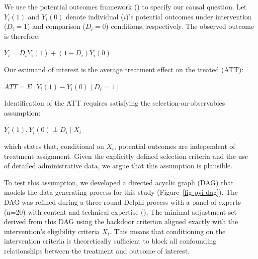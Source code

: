 \documentclass[
  jou,
  floatsintext,
  longtable,
  nolmodern,
  notxfonts,
  notimes,
  colorlinks=true,linkcolor=blue,citecolor=blue,urlcolor=blue]{apa7}
\begin{document}
We use the potential outcomes framework
() to
specify our causal question. Let \(Y_i(1)\) and \(Y_i(0)\) denote
individual (\(i\))'s potential outcomes under intervention (\(D_i = 1\))
and comparison (\(D_i = 0\)) conditions, respectively. The observed
outcome is therefore:

\begin{center}
$Y_i = D_i Y_i(1) + (1 - D_i) Y_i(0)$
\end{center}

Our estimand of interest is the average treatment effect on the treated
(ATT):

\begin{center}
${ATT} = E\left[Y_i(1) - Y_i(0) \mid D_i = 1\right]$
\end{center}

Identification of the ATT requires satisfying the
selection-on-observables assumption:

\begin{center}
${Y_i(1), Y_i(0)} \perp D_i \mid X_i$
\end{center}

which states that, conditional on \(X_i\), potential outcomes are
independent of treatment assignment. Given the explicitly defined
selection criteria and the use of detailed administrative data, we argue
that this assumption is plausible.

To test this assumption, we developed a directed acyclic graph (DAG)
that models the data generating process for this study
(Figure~\ref{fig-pyi-dag}). The DAG was refined during a three-round
Delphi process with a panel of experts (n=20) with content and technical
expertise (). The minimal adjustment set derived from this DAG
using the backdoor criterion aligned exactly with the intervention's
eligibility criteria \(X_i\). This means that conditioning on the
intervention criteria is theoretically sufficient to block all
confounding relationships between the treatment and outcome of interest.
\end{document}
